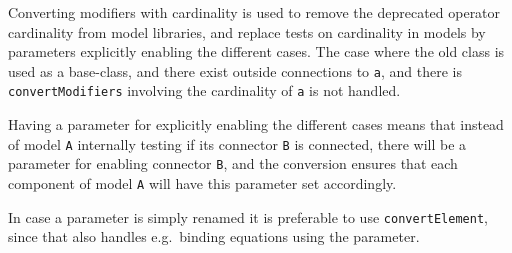 Converting modifiers with cardinality is used to remove the deprecated
operator cardinality from model libraries, and replace tests on
cardinality in models by parameters explicitly enabling the different
cases.  The case where the old class is used as a base-class, and there exist outside connections to
\lstinline!a!, and there is \lstinline!convertModifiers! involving the cardinality of \lstinline!a! is not
handled.

\begin{nonnormative}
Having a parameter for explicitly enabling the different cases means that instead of model \lstinline!A! internally testing if its
connector \lstinline!B! is connected, there will be a parameter for enabling connector \lstinline!B!, and the conversion ensures that
each component of model \lstinline!A! will have this parameter set accordingly.

In case a parameter is simply renamed it is preferable to use \lstinline!convertElement!, since that also handles e.g.\ binding equations
using the parameter.
\end{nonnormative}


